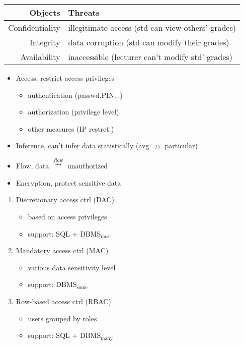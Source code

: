 \begin{minipage}{\linewidth}
  \centering
  \begin{tabular}{r|l}
    \hline
    Objects & Threats \\
    \hline
    Confidentiality & illegitimate access (std can view others' grades)\\
    Integrity & data corruption (std can modify their grades)\\
    Availability & inaccessible (lecturer can't modify std' grades)\\
    \hline
\end{tabular}
\end{minipage}
\begin{minipage}{0.5\linewidth}
\begin{itemize}
\item Access, restrict access privileges
  \begin{itemize}
  \item authentication (passwd,PIN...)
  \item authorization (privilege level)
  \item other measures (IP restrct.)
  \end{itemize}
\item Inference, can't infer data statistically (avg $\nrightarrow$ particular)
\item Flow, data $\overset{flow}{\nrightarrow}$ unauthorized
\item Encryption, protect sensitive data
\end{itemize}
\end{minipage}
\begin{minipage}{0.5\linewidth}
\begin{enumerate}
\item Discretionary access ctrl (DAC)
  \begin{itemize}
  \item based on access privileges
  \item support: SQL + DBMS$_{\text{most}}$
  \end{itemize}
\item Mandatory access ctrl (MAC)
  \begin{itemize}
  \item various data sensitivity level
  \item support:  DBMS$_{\text{some}}$
  \end{itemize}
\item Row-based access ctrl (RBAC)
  \begin{itemize}
  \item users grouped by roles
  \item support: SQL + DBMS$_{\text{many}}$
  \end{itemize}
\end{enumerate}
\end{minipage}
